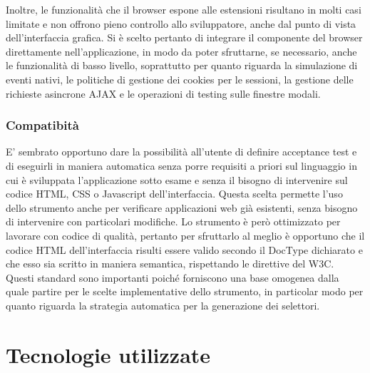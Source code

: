 \documentclass[12pt]{toptesi}
\begin{document}
Inoltre, le funzionalità che il browser espone alle estensioni risultano in molti casi limitate e non offrono pieno controllo allo sviluppatore, anche dal punto di vista dell'interfaccia grafica. Si è scelto pertanto di integrare il componente del browser direttamente nell'applicazione, in modo da poter sfruttarne, se necessario, anche le funzionalità di basso livello, soprattutto per quanto riguarda la simulazione di eventi nativi, le politiche di gestione dei cookies per le sessioni, la gestione delle richieste asincrone AJAX e le operazioni di testing sulle finestre modali. 

\subsection{Compatibità}

E' sembrato opportuno dare la possibilità all'utente di definire acceptance test e di eseguirli in maniera automatica senza porre requisiti a priori sul linguaggio in cui è sviluppata l'applicazione sotto esame e senza il bisogno di intervenire sul codice HTML, CSS o Javascript dell'interfaccia. Questa scelta permette l'uso dello strumento anche per verificare applicazioni web già esistenti, senza bisogno di intervenire con particolari modifiche. Lo strumento è però ottimizzato per lavorare con codice di qualità, pertanto per sfruttarlo al meglio è opportuno che il codice HTML dell'interfaccia risulti essere valido secondo il DocType dichiarato e che esso sia scritto in maniera semantica, rispettando le direttive del W3C. Questi standard sono importanti poiché forniscono una base omogenea dalla quale partire per le scelte implementative dello strumento, in particolar modo per quanto riguarda la strategia automatica per la generazione dei selettori.

\chapter{Tecnologie utilizzate}
\end{document}
